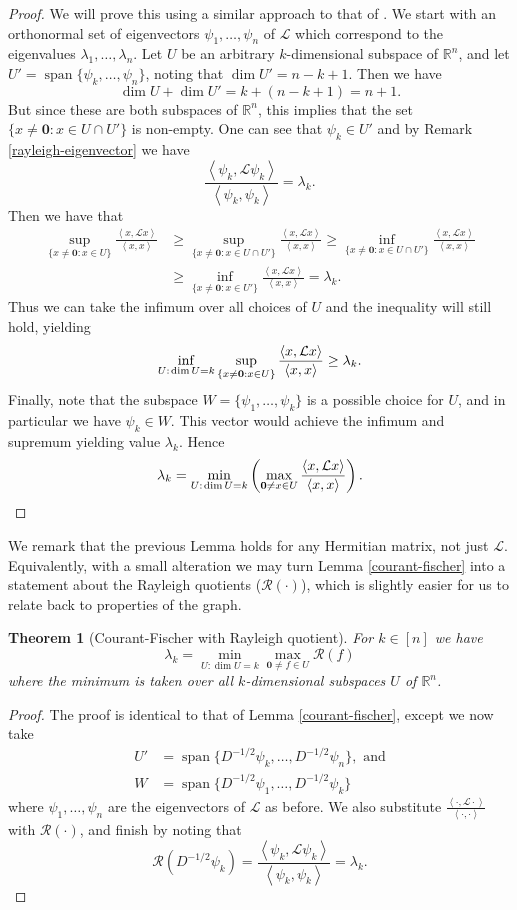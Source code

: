 \documentclass[a4paper,11pt]{article}
\newtheorem{theorem}{Theorem}[section]
\theoremstyle{definition}
\newcommand{\R}{\mathbb{R}}
\renewcommand{\L}{\mathcal{L}}
\newcommand{\rayleigh}[1]{\mathcal{R}\left(#1\right)}
\newcommand{\rayleighinner}[1]{\frac {\inner{#1}{\L #1}} {\inner{#1}{#1}} }
\newcommand{\inner}[2]{\left\langle #1, #2 \right\rangle}
\DeclareMathOperator{\spn}{span}
\begin{document}
\begin{proof}
We will prove this using a similar approach to that of \cite{matrix-analysis}. We start with an orthonormal set of eigenvectors $\psi_1, \dots, \psi_n$ of $\L$ which correspond to the eigenvalues $\lambda_1, \dots, \lambda_n$. Let $U$ be an arbitrary $k$-dimensional subspace of $\R^n$, and let $U' = \spn\{\psi_k, \dots, \psi_n\}$, noting that $\dim{U'} = n-k+1$. Then we have
\[
\dim{U} + \dim{U'} = k + (n-k+1) = n+1.
\]
But since these are both subspaces of $\R^n$, this implies that the set $\{ x \ne \bm{0} : x \in U \cap U' \}$ is non-empty. One can see that $\psi_k \in U'$ and by Remark \ref{rayleigh-eigenvector} we have
\[
\rayleighinner{\psi_k} = \lambda_k.
\]
Then we have that 
\begin{align*}
\sup_{\{x \ne \bm{0} : x \in U\}} \rayleighinner{x} 
&\ge \sup_{\{x \ne \bm{0} : x \in U \cap U'\}} \rayleighinner{x}
\ge \inf_{\{x \ne \bm{0} : x \in U \cap U'\}} \rayleighinner{x} \\
&\ge \inf_{\{x \ne \bm{0} : x \in U'\}} \rayleighinner{x} = \lambda_k.
\end{align*}
Thus we can take the infimum over all choices of $U$ and the inequality will still hold, yielding \[
\inf_{U : \hspace{0.1em} \dim{U} = k} \sup_{\{x \ne \bm{0} : x \in U\}} \rayleighinner{x} \ge \lambda_k.
\]
Finally, note that the subspace $W = \{\psi_1, \dots, \psi_k\}$ is a possible choice for $U$, and in particular we have $\psi_k \in W$. This vector would achieve the infimum and supremum yielding value $\lambda_k$. Hence
\[
\lambda_k = \min_{U : \hspace{0.1em}\dim U = k} \left(\max_{\bm{0} \ne x \in U} \rayleighinner{x} \right).
\]

\end{proof}

We remark that the previous Lemma holds for any Hermitian matrix, not just $\L$. Equivalently, with a small alteration we may turn Lemma \ref{courant-fischer} into a statement about the Rayleigh quotients ($\rayleigh{\cdot}$), which is slightly easier for us to relate back to properties of the graph.

\begin{theorem}[Courant-Fischer with Rayleigh quotient]\label{courant-rayleigh} For $k \in [n]$ we have
\[
\lambda_k = \min_{U : \dim{U} = k} \max_{\bm{0} \ne f \in U} \rayleigh{f}
\]
where the minimum is taken over all $k$-dimensional subspaces $U$ of $\R^n$.
\end{theorem}
\begin{proof}
The proof is identical to that of Lemma \ref{courant-fischer}, except we now take
\begin{align*}
U' &= \spn \{ D^{-1/2}\psi_k, \dots, D^{-1/2}\psi_n \}, \text{ and}\\
W &= \spn\{ D^{-1/2}\psi_1, \dots, D^{-1/2}\psi_k \}
\end{align*} where $\psi_1, \dots, \psi_n$ are the eigenvectors of $\L$ as before. We also substitute $\rayleighinner{\cdot}$ with $\rayleigh{\cdot}$, and finish by noting that
\[
\rayleigh{D^{-1/2}\psi_k} = \rayleighinner{\psi_k} = \lambda_k.
\]
\end{proof}
\end{document}

